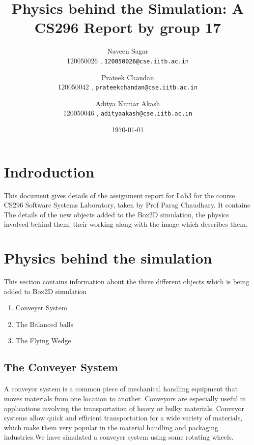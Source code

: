 \documentclass[11pt]{article}
\begin{document}
\title{Physics behind the Simulation: A CS296 Report by group 17}
\author{Naveen Sagar\\
120050026 , \texttt{120050026@cse.iitb.ac.in} \\
\and
Prateek Chandan\\
120050042 , \texttt{prateekchandan@cse.iitb.ac.in} \\
\and
Aditya Kumar Akash\\
120050046 , \texttt{adityaakash@cse.iitb.ac.in} \\} 
\date{\today}
\maketitle 

\section{Indroduction}
This document gives details of the assignment report for Lab3 for the course CS296 Software Systems Laboratory, taken by Prof Parag Chaudhary\cite{sir}. 
It contains The details of the new objects added to the Box2D\cite{box2d} simulation, the physics involved behind them, their working along with the image which describes them.  \\
\section{Physics behind the simulation}
This section contains information about the three different objects which is being added to Box2D simulation 
\begin{enumerate}

    \item Conveyer System
    \item The Balanced balls
    \item The Flying Wedge

\end{enumerate}
\subsection{The Conveyer System}
\paragraph{}
A conveyor system\cite{Wiki:1} is a common piece of mechanical handling equipment that moves materials from one location to another. Conveyors are especially useful in applications involving the transportation of heavy or bulky materials. Conveyor systems allow quick and efficient transportation for a wide variety of materials, which make them very popular in the material handling and packaging industries.We have simulated a conveyer system using some rotating wheels.
\end{document}
